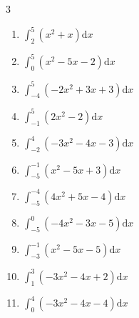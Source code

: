 \begin{multicols}{3}
\begin{enumerate}
  \item $\displaystyle \int_{2}^{5}\left( x^{2}+x \right) \mathrm{d}x$


  \item $\displaystyle \int_{0}^{5}\left( x^{2}-5x-2 \right) \mathrm{d}x$


  \item $\displaystyle \int_{-4}^{5}\left( -2x^{2}+3x+3 \right) \mathrm{d}x$

        \phantom{$\displaystyle =-108$}

  \item $\displaystyle \int_{-1}^{5}\left( 2x^{2}-2 \right) \mathrm{d}x$

        \phantom{$\displaystyle =82$}

\columnbreak %

  \item $\displaystyle \int_{-2}^{4}\left( -3x^{2}-4x-3 \right) \mathrm{d}x$

        \phantom{$\displaystyle =-99$}

  \item $\displaystyle \int_{-5}^{-1}\left( x^{2}-5x+3 \right) \mathrm{d}x$


  \item $\displaystyle \int_{-5}^{-4}\left( 4x^{2}+5x-4 \right) \mathrm{d}x$


  \item $\displaystyle \int_{-5}^{0}\left( -4x^{2}-3x-5 \right) \mathrm{d}x$


  \item $\displaystyle \int_{-3}^{-1}\left( x^{2}-5x-5 \right) \mathrm{d}x$

        \phantom{$\displaystyle =27$}

\columnbreak %

\resetques

  \item $\displaystyle \int_{1}^{3}\left( -3x^{2}-4x+2 \right) \mathrm{d}x$


  \item $\displaystyle \int_{0}^{4}\left( -3x^{2}-4x-4 \right) \mathrm{d}x$


\end{enumerate}
\end{multicols}
